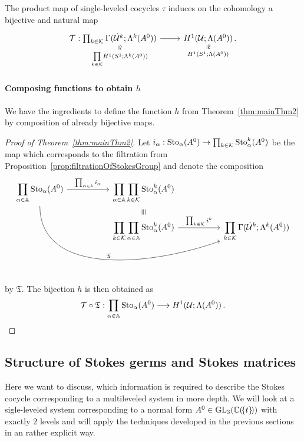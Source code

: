 \begin{cor}
  The product map of single-leveled cocycles $\tau$ induces on the cohomology
  a bijective and natural map
  \[ \begin{tikzcd}
    \cT:
    \underset{\underset{k\in\cK}\prod H^1(S^1;\Lambda^k(A^0))}{%
      \underset{\text{\rotatebox[origin=c]{-90}{$\cong$}}}{%
        \prod_{k\in\cK}\Gamma(\dot\cU^k;\Lambda^k(A^0))}}
    \rar&
    \underset{H^1(S^1;\Lambda(A^0))}{%
      \underset{\text{\rotatebox[origin=c]{-90}{$\cong$}}}{%
        H^1(\cU;\Lambda(A^0))}}\,.
  \end{tikzcd} \]
\end{cor}
\paragraph{Composing functions to obtain $h$}
We have the ingredients to define the function $h$ from
Theorem~\ref{thm:mainThm2} by composition of already bijective maps.
\begin{proof}[Proof of Theorem~\ref{thm:mainThm2}]
  Let $i_\alpha:\operatorname{Sto}_\alpha(A^0)\to\prod_{k\in\mathcal{K}}\operatorname{Sto}_\alpha^k(A^0)$ be the
  map which corresponds to the filtration from
  Proposition~\ref{prop:filtrationOfStokesGroup} and
  denote the composition
  \[ \begin{tikzcd}[column sep=1.8cm,row sep=0]
      \displaystyle \prod_{\alpha\in\A}\Sto_\alpha(A^0)
      \rar{\prod_{\alpha\in\A}i_\alpha}
      \arrow[ddrr, out=270,in=200,"\mathfrak{T}"]
      &
      \displaystyle \prod_{\alpha\in\A}\prod_{k\in\cK}\Sto_\alpha^k(A^0)
    \\&\text{\rotatebox[origin=c]{-90}{$\equiv$}}
    \\&\displaystyle \prod_{k\in\cK}\prod_{\alpha\in\A}\Sto_\alpha^k(A^0)
      \rar{\prod_{k\in\cK}i^k}&
      \displaystyle \prod_{k\in\cK}\Gamma(\dot\cU^k;\Lambda^k(A^0))
  \end{tikzcd} \]
  by $\mathfrak{T}$. The bijection $h$ is then obtained as
  \[
    \mathcal{T}\circ\mathfrak{T}: \prod_{\alpha\in\mathbb{A}}\operatorname{Sto}_\alpha(A^0)
    \longrightarrow H^1(\mathcal{U};\Lambda(A^0)) \,.
  \]
\end{proof}

\subsection{Structure of Stokes germs and Stokes
  matrices}\label{chp:WhichInformationIsNeeded}
Here we want to discuss, which information is required to describe the Stokes
cocycle corresponding to a multileveled system in more depth.
We will look at a sigle-leveled system corresponding to a normal form
$A^0\in \operatorname{GL}_3(\mathbb{C}(\!\{t\}\!))$ with exactly $2$ levels and will apply the
techniques developed in the previous sections in an rather explicit way.

